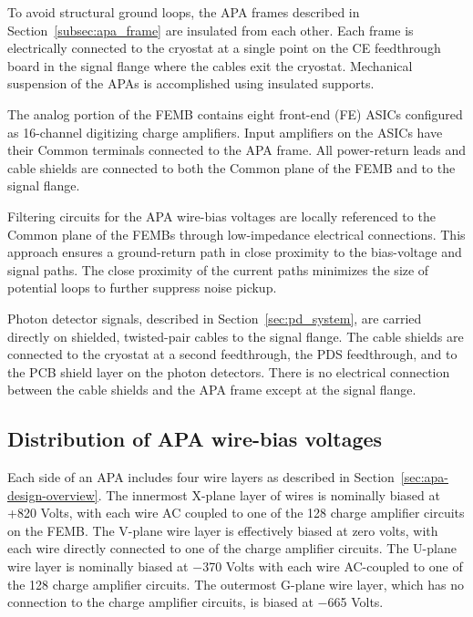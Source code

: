 To avoid structural ground loops, the APA frames described in Section~\ref{subsec:apa_frame} 
are insulated from each other. Each frame is electrically connected to the cryostat at a single 
point on the CE feedthrough board in the signal flange where the cables exit the cryostat. Mechanical suspension of the APAs 
is accomplished using insulated supports. 

The analog portion of the FEMB contains eight front-end (FE) ASICs configured as 16-channel 
digitizing charge amplifiers. Input amplifiers on the ASICs have their Common terminals connected 
to the APA frame.  All power-return leads and cable shields 
are connected to both the Common plane of the FEMB and to the signal flange.

Filtering circuits for the APA wire-bias voltages are locally referenced to the Common plane of the FEMBs through low-impedance 
electrical connections. This approach ensures a ground-return path in close proximity to the 
bias-voltage and signal paths. The close proximity of the current paths minimizes the size of potential loops to further 
suppress noise pickup.

Photon detector signals, described in Section~\ref{sec:pd_system}, are carried directly on shielded, 
twisted-pair cables to the signal flange. The cable shields are connected to the 
cryostat at a second feedthrough, the PDS feedthrough, and to the PCB shield layer on the photon detectors. There is no 
electrical connection between the cable shields and the APA frame except at the signal flange.

%
\subsection{Distribution of APA wire-bias voltages}
\label{subsec:ce_wire_bias}

Each side of an APA includes four wire layers as described in Section~\ref{sec:apa-design-overview}. 
The innermost X-plane layer of wires is nominally biased at +820 Volts, with each wire AC coupled 
to one of the 128 charge amplifier circuits on the FEMB. The V-plane wire layer is effectively biased at zero volts, 
with each wire directly connected to one of the charge amplifier circuits. The U-plane wire layer is nominally 
biased at $-$370 Volts with each wire AC-coupled 
to one of the 128 charge amplifier circuits. The outermost G-plane wire layer,
which has no connection to the charge amplifier circuits, is biased at $-$665 Volts.


